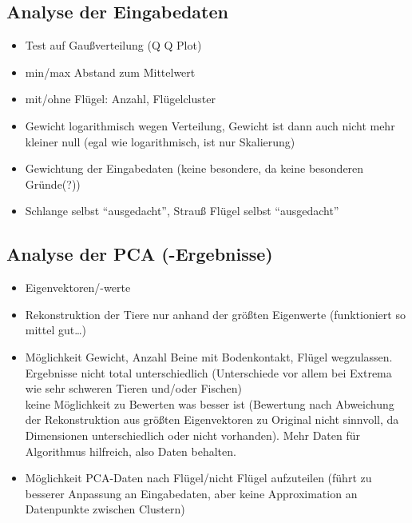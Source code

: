 \subsection{Analyse der Eingabedaten}
 
 \begin{itemize}
  \item Test auf Gaußverteilung (Q Q Plot) 
  \item min/max Abstand zum Mittelwert
  \item mit/ohne Flügel: Anzahl, Flügelcluster
  \item Gewicht logarithmisch wegen Verteilung, Gewicht ist dann auch nicht mehr kleiner null (egal wie logarithmisch, ist nur Skalierung)
  \item Gewichtung der Eingabedaten (keine besondere, da keine besonderen Gründe(?))
  \item Schlange selbst "`ausgedacht"', Strauß Flügel selbst "`ausgedacht"'
 \end{itemize}
 
 
 \subsection{Analyse der PCA (-Ergebnisse)}

 \begin{itemize}
  \item Eigenvektoren/-werte
  \item Rekonstruktion der Tiere nur anhand der größten Eigenwerte (funktioniert so mittel gut\dots)
  \item Möglichkeit Gewicht, Anzahl Beine mit Bodenkontakt, Flügel wegzulassen. Ergebnisse nicht total unterschiedlich (Unterschiede vor allem bei Extrema wie sehr schweren Tieren und/oder Fischen)\\
  keine Möglichkeit zu Bewerten was besser ist (Bewertung nach Abweichung der Rekonstruktion aus größten Eigenvektoren zu Original nicht sinnvoll, da Dimensionen unterschiedlich oder nicht vorhanden). Mehr Daten für Algorithmus hilfreich, also Daten behalten.
  \item Möglichkeit PCA-Daten nach Flügel/nicht Flügel aufzuteilen (führt zu besserer Anpassung an Eingabedaten, aber keine Approximation an Datenpunkte zwischen Clustern) 
 \end{itemize}
 


